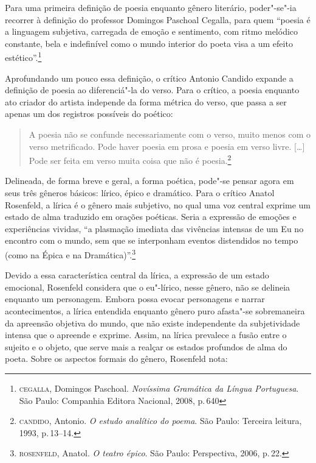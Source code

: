 Para uma primeira definição de poesia enquanto gênero literário, poder"-se"-ia recorrer à definição do professor Domingos Paschoal Cegalla, para quem ``poesia é a linguagem subjetiva, carregada de emoção e sentimento, com ritmo melódico constante, bela e indefinível como o mundo interior do poeta visa a um efeito estético''.\footnote{\textsc{cegalla}, Domingos Paschoal. \textit{Novíssima Gramática da Língua Portuguesa}. São Paulo: Companhia Editora Nacional, 2008, p.\,640}

Aprofundando um pouco essa definição, o crítico Antonio Candido expande a definição de poesia ao diferenciá"-la do verso.
Para o crítico, a poesia enquanto ato criador do artista independe da forma métrica do verso, que passa a ser apenas um dos registros possíveis do poético:

\begin{quote}
A poesia não se confunde necessariamente com o verso, muito menos com o verso metrificado. Pode haver poesia em prosa e poesia em verso livre. [\ldots]
Pode ser feita em verso muita coisa que não é poesia.\footnote{\textsc{candido}, Antonio. \textit{O estudo analítico do poema}. São Paulo: Terceira leitura, 1993, p.\,13--14.}
\end{quote}

Delineada, de forma breve e geral, a forma poética, pode"-se pensar agora em seus três gêneros básicos: lírico, épico e dramático.
Para o crítico Anatol Rosenfeld, a lírica é o gênero mais subjetivo, no qual uma voz central exprime um estado de alma traduzido em orações poéticas.
Seria a expressão de emoções e experiências vividas, ``a plasmação imediata das vivências intensas de um Eu no encontro com o mundo, sem que se interponham eventos distendidos no tempo (como na Épica e na Dramática)''.\footnote{\textsc{rosenfeld}, Anatol. \textit{O teatro épico}. São Paulo: Perspectiva, 2006, p.\,22.}

Devido a essa característica central da lírica, a expressão de um estado emocional, Rosenfeld considera que o eu"-lírico, nesse gênero, não se delineia enquanto um personagem. Embora possa evocar personagens e narrar acontecimentos, a lírica entendida enquanto gênero puro afasta"-se sobremaneira da apreensão objetiva do mundo, que não existe independente da subjetividade intensa que o apreende e exprime. Assim, na lírica prevalece a fusão entre o sujeito e o objeto, que serve mais a realçar os estados profundos de alma do poeta.
Sobre os aspectos formais do gênero, Rosenfeld nota:

